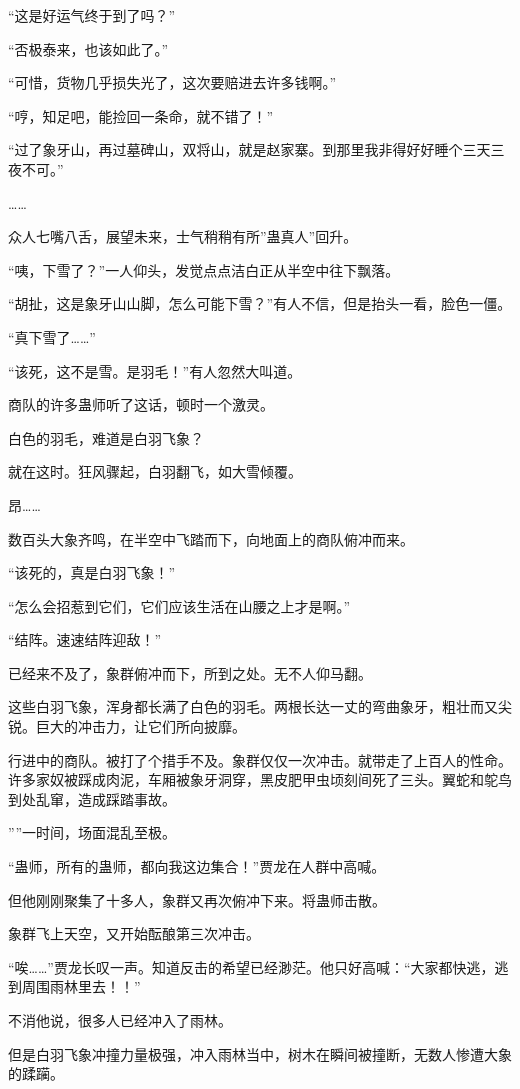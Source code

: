 \begin{this_body}
“这是好运气终于到了吗？”

“否极泰来，也该如此了。”

“可惜，货物几乎损失光了，这次要赔进去许多钱啊。”

“哼，知足吧，能捡回一条命，就不错了！”

“过了象牙山，再过墓碑山，双将山，就是赵家寨。到那里我非得好好睡个三天三夜不可。”

……

众人七嘴八舌，展望未来，士气稍稍有所”蛊真人”回升。

“咦，下雪了？”一人仰头，发觉点点洁白正从半空中往下飘落。

“胡扯，这是象牙山山脚，怎么可能下雪？”有人不信，但是抬头一看，脸色一僵。

“真下雪了……”

“该死，这不是雪。是羽毛！”有人忽然大叫道。

商队的许多蛊师听了这话，顿时一个激灵。

白色的羽毛，难道是白羽飞象？

就在这时。狂风骤起，白羽翻飞，如大雪倾覆。

昂……

数百头大象齐鸣，在半空中飞踏而下，向地面上的商队俯冲而来。

“该死的，真是白羽飞象！”

“怎么会招惹到它们，它们应该生活在山腰之上才是啊。”

“结阵。速速结阵迎敌！”

已经来不及了，象群俯冲而下，所到之处。无不人仰马翻。

这些白羽飞象，浑身都长满了白色的羽毛。两根长达一丈的弯曲象牙，粗壮而又尖锐。巨大的冲击力，让它们所向披靡。

行进中的商队。被打了个措手不及。象群仅仅一次冲击。就带走了上百人的性命。许多家奴被踩成肉泥，车厢被象牙洞穿，黑皮肥甲虫顷刻间死了三头。翼蛇和鸵鸟到处乱窜，造成踩踏事故。

””一时间，场面混乱至极。

“蛊师，所有的蛊师，都向我这边集合！”贾龙在人群中高喊。

但他刚刚聚集了十多人，象群又再次俯冲下来。将蛊师击散。

象群飞上天空，又开始酝酿第三次冲击。

“唉……”贾龙长叹一声。知道反击的希望已经渺茫。他只好高喊：“大家都快逃，逃到周围雨林里去！！”

不消他说，很多人已经冲入了雨林。

但是白羽飞象冲撞力量极强，冲入雨林当中，树木在瞬间被撞断，无数人惨遭大象的蹂躏。


\end{this_body}
